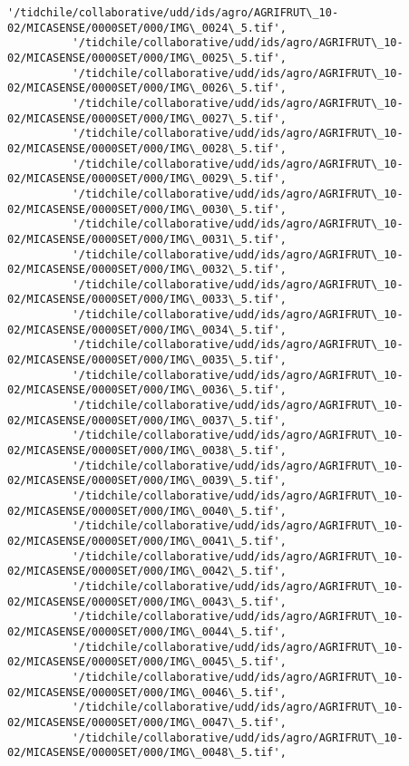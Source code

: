 \documentclass[11pt]{article}
\begin{document}
\begin{Verbatim}[commandchars=\\\{\}]
          '/tidchile/collaborative/udd/ids/agro/AGRIFRUT\_10-02/MICASENSE/0000SET/000/IMG\_0024\_5.tif',
          '/tidchile/collaborative/udd/ids/agro/AGRIFRUT\_10-02/MICASENSE/0000SET/000/IMG\_0025\_5.tif',
          '/tidchile/collaborative/udd/ids/agro/AGRIFRUT\_10-02/MICASENSE/0000SET/000/IMG\_0026\_5.tif',
          '/tidchile/collaborative/udd/ids/agro/AGRIFRUT\_10-02/MICASENSE/0000SET/000/IMG\_0027\_5.tif',
          '/tidchile/collaborative/udd/ids/agro/AGRIFRUT\_10-02/MICASENSE/0000SET/000/IMG\_0028\_5.tif',
          '/tidchile/collaborative/udd/ids/agro/AGRIFRUT\_10-02/MICASENSE/0000SET/000/IMG\_0029\_5.tif',
          '/tidchile/collaborative/udd/ids/agro/AGRIFRUT\_10-02/MICASENSE/0000SET/000/IMG\_0030\_5.tif',
          '/tidchile/collaborative/udd/ids/agro/AGRIFRUT\_10-02/MICASENSE/0000SET/000/IMG\_0031\_5.tif',
          '/tidchile/collaborative/udd/ids/agro/AGRIFRUT\_10-02/MICASENSE/0000SET/000/IMG\_0032\_5.tif',
          '/tidchile/collaborative/udd/ids/agro/AGRIFRUT\_10-02/MICASENSE/0000SET/000/IMG\_0033\_5.tif',
          '/tidchile/collaborative/udd/ids/agro/AGRIFRUT\_10-02/MICASENSE/0000SET/000/IMG\_0034\_5.tif',
          '/tidchile/collaborative/udd/ids/agro/AGRIFRUT\_10-02/MICASENSE/0000SET/000/IMG\_0035\_5.tif',
          '/tidchile/collaborative/udd/ids/agro/AGRIFRUT\_10-02/MICASENSE/0000SET/000/IMG\_0036\_5.tif',
          '/tidchile/collaborative/udd/ids/agro/AGRIFRUT\_10-02/MICASENSE/0000SET/000/IMG\_0037\_5.tif',
          '/tidchile/collaborative/udd/ids/agro/AGRIFRUT\_10-02/MICASENSE/0000SET/000/IMG\_0038\_5.tif',
          '/tidchile/collaborative/udd/ids/agro/AGRIFRUT\_10-02/MICASENSE/0000SET/000/IMG\_0039\_5.tif',
          '/tidchile/collaborative/udd/ids/agro/AGRIFRUT\_10-02/MICASENSE/0000SET/000/IMG\_0040\_5.tif',
          '/tidchile/collaborative/udd/ids/agro/AGRIFRUT\_10-02/MICASENSE/0000SET/000/IMG\_0041\_5.tif',
          '/tidchile/collaborative/udd/ids/agro/AGRIFRUT\_10-02/MICASENSE/0000SET/000/IMG\_0042\_5.tif',
          '/tidchile/collaborative/udd/ids/agro/AGRIFRUT\_10-02/MICASENSE/0000SET/000/IMG\_0043\_5.tif',
          '/tidchile/collaborative/udd/ids/agro/AGRIFRUT\_10-02/MICASENSE/0000SET/000/IMG\_0044\_5.tif',
          '/tidchile/collaborative/udd/ids/agro/AGRIFRUT\_10-02/MICASENSE/0000SET/000/IMG\_0045\_5.tif',
          '/tidchile/collaborative/udd/ids/agro/AGRIFRUT\_10-02/MICASENSE/0000SET/000/IMG\_0046\_5.tif',
          '/tidchile/collaborative/udd/ids/agro/AGRIFRUT\_10-02/MICASENSE/0000SET/000/IMG\_0047\_5.tif',
          '/tidchile/collaborative/udd/ids/agro/AGRIFRUT\_10-02/MICASENSE/0000SET/000/IMG\_0048\_5.tif',

\end{Verbatim}
\end{document}
